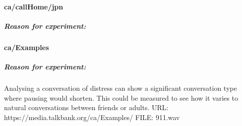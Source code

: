 \paragraph{ca/callHome/jpn}
\subparagraph{Reason for experiment:} 



\paragraph{ca/Examples}
\subparagraph{Reason for experiment:} Analysing a conversation of distress can show a significant conversation type where pausing would shorten. This could be measured to see how it varies to natural conversations between friends or adults. 
URL: https://media.talkbank.org/ca/Examples/
FILE: 911.wav